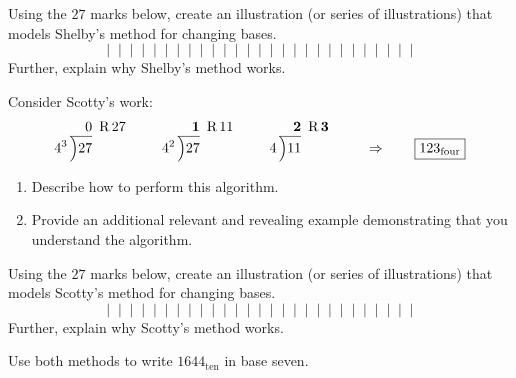 \begin{prob} 
Using the $27$ marks below, create an illustration (or series of illustrations) that models Shelby's method for changing bases.
\[
|\;\;|\;\;|\;\;|\;\;|\;\;|\;\;|\;\;|\;\;|\;\;|\;\;|\;\;|\;\;|\;\;|\;\;|\;\;|\;\;|\;\;|\;\;|\;\;|\;\;|\;\;|\;\;|\;\;|\;\;|\;\;|\;\;|
\]
Further, explain why Shelby's method works. 
\end{prob}


\begin{prob} Consider Scotty's work:
\[
4^3\,\begin{tabular}[b]{@{}r@{} r}
$0$ &\, R\,$27$\\ \cline{1-1}
\Big)\begin{tabular}[t]{@{}l@{}}
$27$ 
\end{tabular}
\end{tabular}
\qquad
4^2\,\begin{tabular}[b]{@{}r@{} r}
$\boldsymbol{1}$ &\, R\,$11$\\ \cline{1-1}
\Big)\begin{tabular}[t]{@{}l@{}}
$27$ 
\end{tabular}
\end{tabular}
\qquad
4\,\begin{tabular}[b]{@{}r@{} r}
$\boldsymbol{2}$ &\, R\,$\boldsymbol{3}$\\ \cline{1-1}
\Big)\begin{tabular}[t]{@{}l@{}}
$11$ 
\end{tabular}
\end{tabular} \qquad \Rightarrow \qquad \fbox{$123_\textrm{four}$}
\]
\begin{enumerate}
\item Describe how to perform this algorithm.
\item Provide an additional relevant and revealing example
  demonstrating that you understand the algorithm.
\end{enumerate}
\end{prob}


\begin{prob} 
Using the $27$ marks below, create an illustration (or series of illustrations) that models Scotty's method for changing bases.
\[
|\;\;|\;\;|\;\;|\;\;|\;\;|\;\;|\;\;|\;\;|\;\;|\;\;|\;\;|\;\;|\;\;|\;\;|\;\;|\;\;|\;\;|\;\;|\;\;|\;\;|\;\;|\;\;|\;\;|\;\;|\;\;|\;\;|
\]
Further, explain why Scotty's method works. 
\end{prob}

\begin{prob}
Use both methods to write $1644_\textrm{ten}$ in base seven.
\end{prob}

